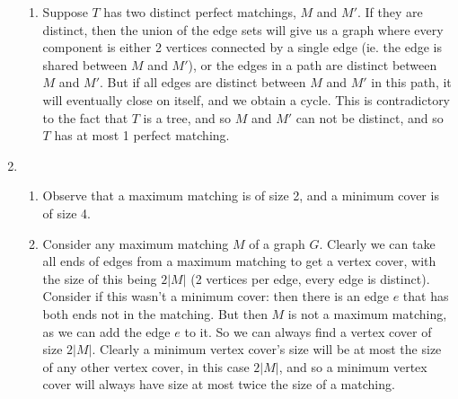 \documentclass[10pt,english]{article}
\begin{document}
\begin{enumerate}
\begin{enumerate}
    \item Suppose $T$ has two distinct perfect matchings, $M$ and $M'$. If they are distinct, then the union of the edge sets will give us a graph where every component is either 2 vertices connected by a single edge (ie. the edge is shared between $M$ and $M'$), or the edges in a path are distinct between $M$ and $M'$. But if all edges are distinct between $M$ and $M'$ in this path, it will eventually close on itself, and we obtain a cycle. This is contradictory to the fact that $T$ is a tree, and so $M$ and $M'$ can not be distinct, and so $T$ has at most 1 perfect matching. 
\end{enumerate}



\pagebreak\item \begin{enumerate}
    \item \leavevmode\vadjust{\vspace{-\baselineskip}}\newline
     Observe that a maximum matching is of size 2, and a minimum cover is of size 4. 
    \item Consider any maximum matching $M$ of a graph $G$. Clearly we can take all ends of edges from a maximum matching to get a vertex cover, with the size of this being $2|M|$ (2 vertices per edge, every edge is distinct). Consider if this wasn't a minimum cover: then there is an edge $e$ that has both ends not in the matching. But then $M$ is not a maximum matching, as we can add the edge $e$ to it. So we can always find a vertex cover of size $2|M|$. Clearly a minimum vertex cover's size will be at most the size of any other vertex cover, in this case $2|M|$, and so a minimum vertex cover will always have size at most twice the size of a matching.
\end{enumerate}
\end{enumerate}
\end{document}
